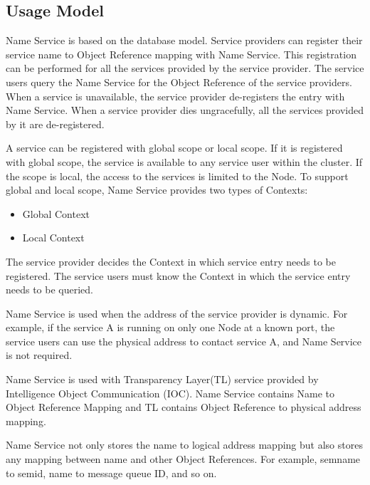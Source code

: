 \begin{flushleft}
\section{Usage Model}
Name Service is based on the database model. Service providers can register their service name to Object Reference mapping with Name Service. This registration
can be performed for all the services provided by the service provider. The service users query the Name Service for the Object Reference of the service providers. 
When a service is unavailable, the service provider de-registers the entry with Name Service. When a service provider dies ungracefully, all the services provided by it are de-registered. 
\par
A service can be registered with global scope or local scope. If it is registered with global scope, the service is available to any service user within 
the cluster. If the scope is local, the access to the services is limited to the Node. To support global and local scope, Name Service provides two types of Contexts:
\begin{itemize}
\item
Global Context 
\item
Local Context
\end{itemize}
The service provider decides the Context in which service entry needs to be registered. The service users must know the Context in which the service entry
needs to be queried. 
\par
Name Service is used when the address of the service provider is dynamic. For example, if the service A is running on only one Node at a known
port, the service users can use the physical address to contact service A, and Name Service is not required.
\par
Name Service is used with Transparency Layer(TL) service provided by Intelligence Object Communication (IOC). Name Service contains Name to Object Reference Mapping and TL 
contains Object Reference to physical address mapping.  
\par
Name Service not only stores the name to logical address mapping but also stores any mapping between name and other Object References. For example, semname to semid,
name to message queue ID, and so on.


\end{flushleft}
